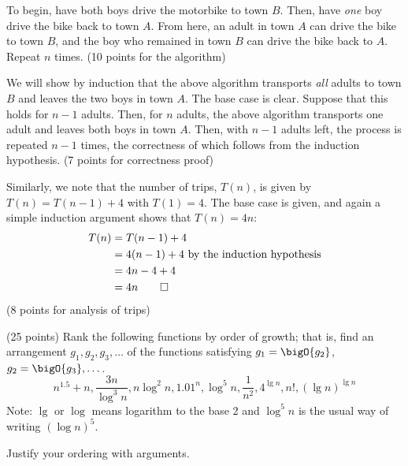 \documentclass[draft]{article}
\begin{document}
\begin{solution}
    To begin, have both boys drive the motorbike to town $B$. Then, have \emph{one} boy drive the bike back to town $A$. From here, an adult in town $A$ can drive the bike to town $B$, and the boy who remained in town $B$ can drive the bike back to $A$. Repeat $n$ times. (10 points for the algorithm)

    We will show by induction that the above algorithm transports \emph{all} adults to town $B$ and leaves the two boys in town $A$. The base case is clear. Suppose that this holds for $n - 1$ adults. Then, for $n$ adults, the above algorithm transports one adult and leaves both boys in town $A$. Then, with $n - 1$ adults left, the process is repeated $n - 1$ times, the correctness of which follows from the induction hypothesis. (7 points for correctness proof)

    Similarly, we note that the number of trips, $T(n)$, is given by $T(n) = T(n - 1) + 4$ with $T(1) = 4$. The base case is given, and again a simple induction argument shows that $T(n) = 4n$:
    \begin{align*}T(n)
         & = T(n - 1) + 4                                     \\
         & = 4(n - 1) + 4 \hbox{ by the induction hypothesis} \\
         & = 4n - 4 + 4                                       \\
         & = 4n\qedhere
    \end{align*}
    (8 points for analysis of trips)
\end{solution}

\begin{exercise}{2.12} (25 points)
    Rank the following functions by order of growth; that is, find an
    arrangement $g_1, g_2, g_3, \dots$ of the functions satisfying
    $g_1=\bigO{g_2}$, $g_2=\bigO{g_3}, \dots$.
    \[n^{1.5} + n, \frac{3n}{\log^3 n}, n \log^2 n, 1.01^n,   \log^{5} n,
        \frac{1}{n^2},  4^{\lg n}, n!,  (\lg n)^{\lg n}\]
    Note: $\lg$ or $\log$ means logarithm to the base 2 and $\log^{5} n$ is the usual way of writing
    $(\log n)^{5}$.

    Justify your ordering with arguments.
\end{exercise}
\end{document}
